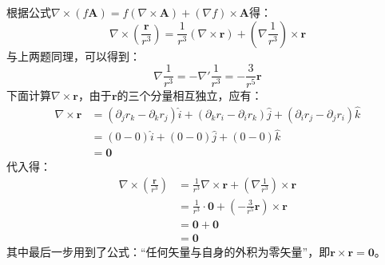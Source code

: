 \documentclass[a4paper,fontset=none]{ctexart}
\begin{document}
\begin{itemize}
        \textparagraph 根据公式$\nabla\times(f\bm{A}) = f(\nabla\times\bm{A}) + (\nabla f)\times\bm{A}$得：
        \[
            \nabla\times(\frac{\bm{r}}{r^3}) = \frac{1}{r^3}(\nabla\times\bm{r}) + \left(\nabla\frac{1}{r^3}\right)\times\bm{r}
        \]
        与上两题同理，可以得到：
        \[
            \nabla\frac{1}{r^3} = -\nabla'\frac{1}{r^3} = -\frac{3}{r^5}\bm{r}
        \]
        下面计算$\nabla\times\bm{r}$，由于$\bm{r}$的三个分量相互独立，应有：
        \begin{align*}
            \nabla\times\bm{r}
            &= (\partial_j r_k - \partial_k r_j)\hat{i} + (\partial_k r_i - \partial_i r_k)\hat{j} + (\partial_i r_j - \partial_j r_i)\hat{k} \\
            &= (0-0)\hat{i} + (0-0)\hat{j} + (0-0)\hat{k} \\
            &= \bm{0}
        \end{align*}
        代入得：
        \begin{align*}
            \nabla\times(\frac{\bm{r}}{r^3})
            &= \frac{1}{r^3}\nabla\times\bm{r} + (\nabla\frac{1}{r^3})\times\bm{r} \\
            &= \frac{1}{r^3}\cdot\bm{0} + \left(-\frac{3}{r^5}\bm{r}\right)\times\bm{r} \\
            &= \bm{0} + \bm{0} \\
            &= \bm{0}
        \end{align*}
        其中最后一步用到了公式：“任何矢量与自身的外积为零矢量”，即$\bm{r}\times\bm{r} = \bm{0}$。


\end{itemize}
\end{document}
